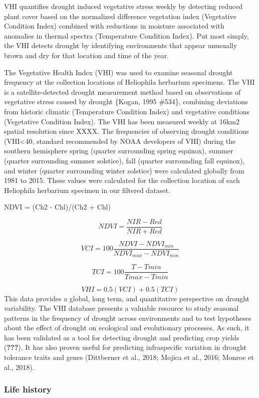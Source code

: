 \documentclass[man,floatsintext]{apa6}
\theoremstyle{definition}
\theoremstyle{definition}
\theoremstyle{definition}
\theoremstyle{remark}
\begin{document}
VHI quantifies drought induced vegetative stress weekly by detecting
reduced plant cover based on the normalized difference vegetation index
(Vegetative Condition Index) combined with reductions in moisture
associated with anomalies in thermal spectra (Temperature Condition
Index). Put most simply, the VHI detects drought by identifying
environments that appear unusually brown and dry for that location and
time of the year.

The Vegetative Health Index (VHI) was used to examine seasonal drought
frequency at the collection locations of Heliophila herbarium specimens.
The VHI is a satellite-detected drought measurement method based on
observations of vegetative stress caused by drought \{Kogan, 1995
\#534\}, combining deviations from historic climatic (Temperature
Condition Index) and vegetative conditions (Vegetative Condition Index).
The VHI has been measured weekly at 16km2 spatial resolution since XXXX.
The frequencies of observing drought conditions (VHI\textless{}40,
standard recommended by NOAA developers of VHI) during the southern
hemisphere spring (quarter surrounding spring equinox), summer (quarter
surrounding summer solstice), fall (quarter surrounding fall equinox),
and winter (quarter surrounding winter solstice) were calculated
globally from 1981 to 2015. These values were calculated for the
collection location of each Heliophila herbarium specimen in our
filtered dataset.

NDVI = (Ch2 - Chl)/(Ch2 + Chl)

\[NDVI = \frac{NIR - Red}{NIR + Red}\]

\[VCI = 100\frac{NDVI - NDVI_{min}}{NDVI_{max} - NDVI_{min}}\]

\[TCI = 100\frac{T - T{min}}{T{max} - T{min}}\]

\[VHI = 0.5(VCI) + 0.5(TCI)\] This data provides a global, long term,
and quantitative perspective on drought variability. The VHI database
presents a valuable resource to study seasonal patterns in the frequency
of drought across environments and to test hypotheses about the effect
of drought on ecological and evolutionary processes. As such, it has
been validated as a tool for detecting drought and predicting crop
yields ({\textbf{???}}). It has also proven useful for predicting
infraspecific variation in drought tolerance traits and genes
(Dittberner et al., 2018; Mojica et al., 2016; Monroe et al., 2018).

\hypertarget{life-history-1}{%
\subsubsection{Life history}\label{life-history-1}}
\end{document}
